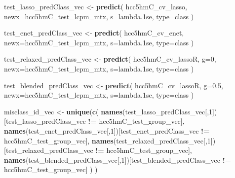 \documentclass[
]{book}
\newenvironment{Shaded}{\begin{snugshade}}{\end{snugshade}}
\newcommand{\DataTypeTok}[1]{\textcolor[rgb]{0.13,0.29,0.53}{#1}}
\newcommand{\DecValTok}[1]{\textcolor[rgb]{0.00,0.00,0.81}{#1}}
\newcommand{\FloatTok}[1]{\textcolor[rgb]{0.00,0.00,0.81}{#1}}
\newcommand{\KeywordTok}[1]{\textcolor[rgb]{0.13,0.29,0.53}{\textbf{#1}}}
\newcommand{\NormalTok}[1]{#1}
\newcommand{\OperatorTok}[1]{\textcolor[rgb]{0.81,0.36,0.00}{\textbf{#1}}}
\newcommand{\StringTok}[1]{\textcolor[rgb]{0.31,0.60,0.02}{#1}}
\begin{document}
\begin{Shaded}
\begin{Highlighting}[]
\NormalTok{test\_lasso\_predClass\_vec <{-}}\StringTok{ }\KeywordTok{predict}\NormalTok{(}
\NormalTok{ hcc5hmC\_cv\_lasso,}
 \DataTypeTok{newx=}\NormalTok{hcc5hmC\_test\_lcpm\_mtx,}
 \DataTypeTok{s=}\StringTok{\textquotesingle{}lambda.1se\textquotesingle{}}\NormalTok{,}
 \DataTypeTok{type=}\StringTok{\textquotesingle{}class\textquotesingle{}}
\NormalTok{)}

\NormalTok{test\_enet\_predClass\_vec <{-}}\StringTok{ }\KeywordTok{predict}\NormalTok{(}
\NormalTok{ hcc5hmC\_cv\_enet,}
 \DataTypeTok{newx=}\NormalTok{hcc5hmC\_test\_lcpm\_mtx,}
 \DataTypeTok{s=}\StringTok{\textquotesingle{}lambda.1se\textquotesingle{}}\NormalTok{,}
 \DataTypeTok{type=}\StringTok{\textquotesingle{}class\textquotesingle{}}
\NormalTok{)}

\NormalTok{test\_relaxed\_predClass\_vec <{-}}\StringTok{ }\KeywordTok{predict}\NormalTok{(}
\NormalTok{ hcc5hmC\_cv\_lassoR,}
 \DataTypeTok{g=}\DecValTok{0}\NormalTok{,}
 \DataTypeTok{newx=}\NormalTok{hcc5hmC\_test\_lcpm\_mtx,}
 \DataTypeTok{s=}\StringTok{\textquotesingle{}lambda.1se\textquotesingle{}}\NormalTok{,}
 \DataTypeTok{type=}\StringTok{\textquotesingle{}class\textquotesingle{}}
\NormalTok{)}

\NormalTok{test\_blended\_predClass\_vec <{-}}\StringTok{ }\KeywordTok{predict}\NormalTok{(}
\NormalTok{ hcc5hmC\_cv\_lassoR,}
 \DataTypeTok{g=}\FloatTok{0.5}\NormalTok{,}
 \DataTypeTok{newx=}\NormalTok{hcc5hmC\_test\_lcpm\_mtx,}
 \DataTypeTok{s=}\StringTok{\textquotesingle{}lambda.1se\textquotesingle{}}\NormalTok{,}
 \DataTypeTok{type=}\StringTok{\textquotesingle{}class\textquotesingle{}}
\NormalTok{)}

\NormalTok{misclass\_id\_vec <{-}}\StringTok{ }\KeywordTok{unique}\NormalTok{(}\KeywordTok{c}\NormalTok{(}
 \KeywordTok{names}\NormalTok{(test\_lasso\_predClass\_vec[,}\DecValTok{1}\NormalTok{])[test\_lasso\_predClass\_vec }\OperatorTok{!=}\StringTok{ }\NormalTok{hcc5hmC\_test\_group\_vec],}
 \KeywordTok{names}\NormalTok{(test\_enet\_predClass\_vec[,}\DecValTok{1}\NormalTok{])[test\_enet\_predClass\_vec }\OperatorTok{!=}\StringTok{ }\NormalTok{hcc5hmC\_test\_group\_vec],}
 \KeywordTok{names}\NormalTok{(test\_relaxed\_predClass\_vec[,}\DecValTok{1}\NormalTok{])[test\_relaxed\_predClass\_vec }\OperatorTok{!=}\StringTok{ }\NormalTok{hcc5hmC\_test\_group\_vec],}
 \KeywordTok{names}\NormalTok{(test\_blended\_predClass\_vec[,}\DecValTok{1}\NormalTok{])[test\_blended\_predClass\_vec }\OperatorTok{!=}\StringTok{ }\NormalTok{hcc5hmC\_test\_group\_vec]}
\NormalTok{ )}
\NormalTok{)}



\end{Highlighting}
\end{Shaded}
\end{document}

